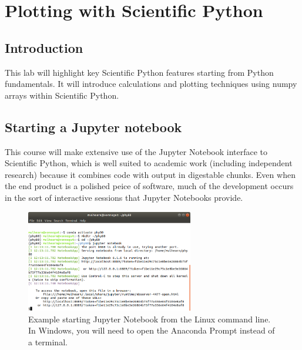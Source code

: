 \chapter{Plotting with Scientific Python}

\section{Introduction}

This lab will highlight key Scientific Python features starting from
Python fundamentals.  It will introduce calculations and plotting
techniques using numpy arrays within Scientific Python.

\section{Starting a Jupyter notebook}

This course will make extensive use of the Jupyter Notebook interface
to Scientific Python, which is well suited to academic work (including
independent research) because it combines code with output in
digestable chunks.  Even when the end product is a polished peice of
software, much of the development occurs in the sort of interactive
sessions that Jupyter Notebooks provide.  

\begin{figure}[htbp]
\begin{center}
\includegraphics[width=0.65\textwidth]{figs/plotting/jupyter_startup.png} 
\caption{Example starting Jupyter Notebook from the Linux command line.  In Windows, you will need to open the Anaconda Prompt instead of a terminal.}
\label{fig:jupyterstartup}
\end{center}
\end{figure}

